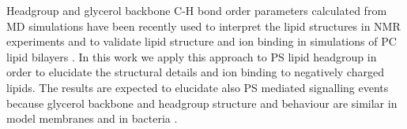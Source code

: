 \documentclass[aps,prl,superscriptaddress,twocolumn]{revtex4}
\begin{document}
Headgroup and glycerol backbone C-H bond order parameters
calculated from MD simulations have been
recently used to interpret the lipid structures in NMR experiments
and to validate lipid structure and ion binding in simulations of
PC lipid bilayers \cite{botan15,catte16,ollila16,ferreira16}.
In this work we apply this approach to PS lipid headgroup
in order to elucidate the structural details and ion binding
to negatively charged lipids. The results are expected to elucidate
also PS mediated signalling events because 
glycerol backbone and headgroup structure and behaviour are similar
in model membranes and in bacteria \cite{gally81,scherer87,seelig90}.








\end{document}
